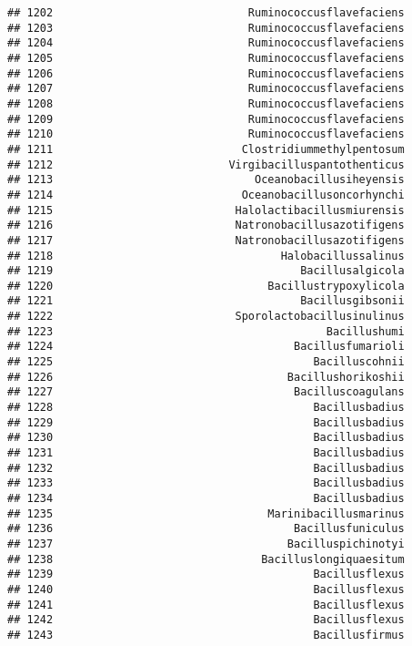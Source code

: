 \documentclass[
]{article}
\begin{document}
\begin{verbatim}
## 1202                              Ruminococcusflavefaciens
## 1203                              Ruminococcusflavefaciens
## 1204                              Ruminococcusflavefaciens
## 1205                              Ruminococcusflavefaciens
## 1206                              Ruminococcusflavefaciens
## 1207                              Ruminococcusflavefaciens
## 1208                              Ruminococcusflavefaciens
## 1209                              Ruminococcusflavefaciens
## 1210                              Ruminococcusflavefaciens
## 1211                             Clostridiummethylpentosum
## 1212                           Virgibacilluspantothenticus
## 1213                               Oceanobacillusiheyensis
## 1214                             Oceanobacillusoncorhynchi
## 1215                            Halolactibacillusmiurensis
## 1216                            Natronobacillusazotifigens
## 1217                            Natronobacillusazotifigens
## 1218                                   Halobacillussalinus
## 1219                                      Bacillusalgicola
## 1220                                 Bacillustrypoxylicola
## 1221                                      Bacillusgibsonii
## 1222                            Sporolactobacillusinulinus
## 1223                                          Bacillushumi
## 1224                                     Bacillusfumarioli
## 1225                                        Bacilluscohnii
## 1226                                    Bacillushorikoshii
## 1227                                     Bacilluscoagulans
## 1228                                        Bacillusbadius
## 1229                                        Bacillusbadius
## 1230                                        Bacillusbadius
## 1231                                        Bacillusbadius
## 1232                                        Bacillusbadius
## 1233                                        Bacillusbadius
## 1234                                        Bacillusbadius
## 1235                                 Marinibacillusmarinus
## 1236                                     Bacillusfuniculus
## 1237                                    Bacilluspichinotyi
## 1238                                Bacilluslongiquaesitum
## 1239                                        Bacillusflexus
## 1240                                        Bacillusflexus
## 1241                                        Bacillusflexus
## 1242                                        Bacillusflexus
## 1243                                        Bacillusfirmus

\end{verbatim}
\end{document}

